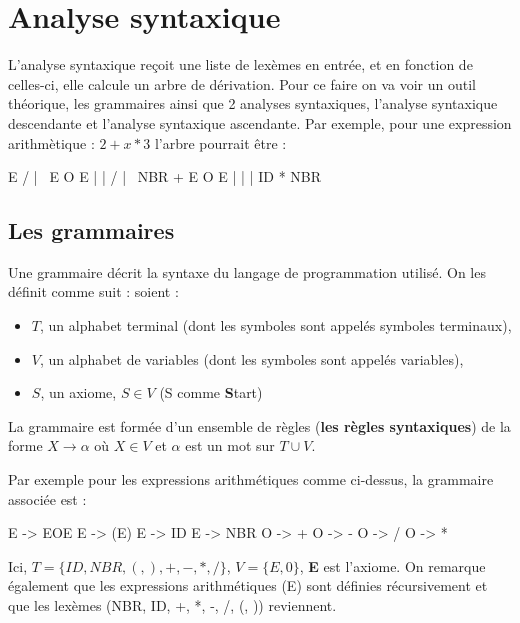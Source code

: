 \documentclass{article}
\begin{document}
\section{Analyse syntaxique}

L'analyse syntaxique reçoit une liste de lexèmes en entrée, et en fonction de celles-ci, elle calcule un arbre de dérivation. Pour ce faire on va voir un outil théorique, les grammaires 
ainsi que 2 analyses syntaxiques, l'analyse syntaxique descendante et l'analyse syntaxique ascendante. Par exemple, pour une expression arithmètique : $2+x*3$ l'arbre pourrait 
être : 

\begin{center}
	\begin{boxedverbatim}
      E
  /   |   \
 E    O    E
 |    |  / | \
NBR   + E  O  E
        |  |  |
       ID  * NBR
	\end{boxedverbatim}
\end{center}

\subsection{Les grammaires}

Une grammaire décrit la syntaxe du langage de programmation utilisé. On les définit comme suit : soient : 
\begin{itemize}
\item $T$, un alphabet terminal (dont les symboles sont appelés symboles terminaux),
\item $V$, un alphabet de variables (dont les symboles sont appelés variables),
\item $S$, un axiome, $S\in V$ (S comme \textbf{S}tart)
\end{itemize}
La grammaire est formée d'un ensemble de règles (\textbf{les règles syntaxiques}) de la forme $X\rightarrow \alpha$ où $X\in V$ et $\alpha$ est un mot sur $T\cup V$.

Par exemple pour les expressions arithmétiques comme ci-dessus, la grammaire associée est :
\begin{center}
	\begin{boxedverbatim}
E -> EOE
E -> (E)
E -> ID
E -> NBR
O -> +
O -> -
O -> /
O -> *
	\end{boxedverbatim}
\end{center}

Ici, $T = \{ID, NBR, (, ), +, -, *, /\}$, $V=\{E,0\}$, \textbf{E} est l'axiome. On remarque également que les expressions arithmétiques (E) sont définies récursivement et que les 
lexèmes (NBR, ID, +, *, -, /, (, )) reviennent.
\end{document}
